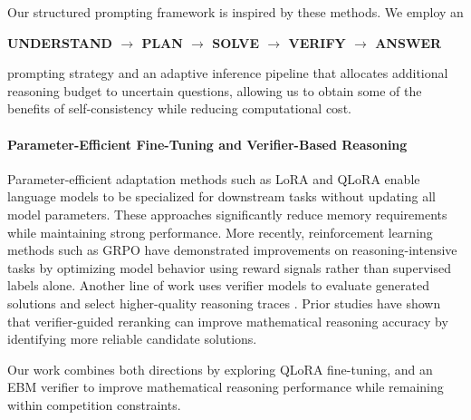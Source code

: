 \documentclass{article}
\begin{document}
Our structured prompting framework is inspired by these methods. We employ an 
\begin{center}
    \textbf{UNDERSTAND $\rightarrow$ PLAN $\rightarrow$ SOLVE $\rightarrow$ VERIFY $\rightarrow$ ANSWER}
\end{center}
prompting strategy and an adaptive inference pipeline that allocates additional reasoning budget to uncertain questions, allowing us to obtain some of the benefits of self-consistency while reducing computational cost.

\paragraph{Parameter-Efficient Fine-Tuning and Verifier-Based Reasoning}
Parameter-efficient adaptation methods such as LoRA \cite{hu2021lora} and QLoRA \cite{dettmers2023qlora} enable language models to be specialized for downstream tasks without updating all model parameters. These approaches significantly reduce memory requirements while maintaining strong performance. More recently, reinforcement learning methods such as GRPO \cite{shao2024grpo} have demonstrated improvements on reasoning-intensive tasks by optimizing model behavior using reward signals rather than supervised labels alone. Another line of work uses verifier models to evaluate generated solutions and select higher-quality reasoning traces \cite{lightman2023verify}. Prior studies have shown that verifier-guided reranking can improve mathematical reasoning accuracy by identifying more reliable candidate solutions.

Our work combines both directions by exploring QLoRA fine-tuning, and an EBM verifier to improve mathematical reasoning performance while remaining within competition constraints.



\end{document}
